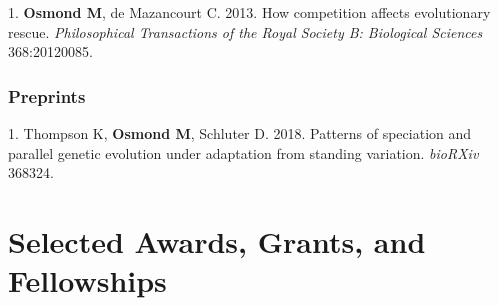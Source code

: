 \documentclass[12pt]{article}
\begin{document}
\noindent\hspace{.1cm}1. \textbf{Osmond M}, de Mazancourt C. 2013. How competition affects evolutionary rescue. \textit{Philosophical Transactions of the Royal Society B: Biological Sciences} 368:20120085. %

%

\subsubsection*{Preprints}

\noindent\hspace{.1cm}1. Thompson K, \textbf{Osmond M}, Schluter D. 2018. Patterns of speciation and parallel genetic evolution under adaptation from standing variation. \textit{bioRXiv} 368324.



\section*{Selected Awards, Grants, and Fellowships}
\end{document}
